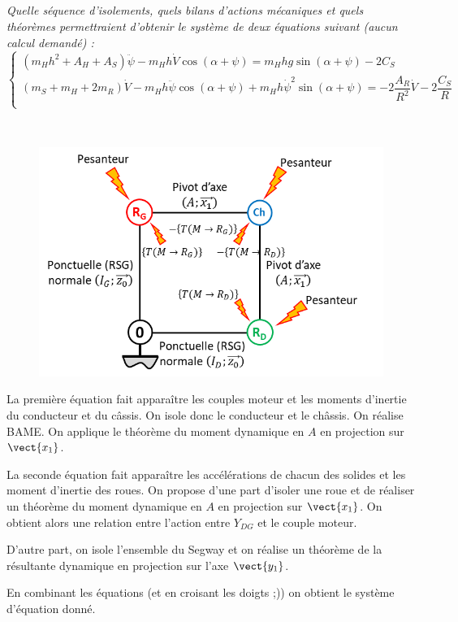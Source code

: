\documentclass[10pt,fleqn]{article} %
\begin{document}
\subparagraph{\label{q_19}}\textit{Quelle séquence d’isolements, quels bilans d'actions mécaniques et quels théorèmes permettraient d'obtenir le système de deux équations suivant (aucun calcul demandé) :}
$$
\left\{
\begin{array}{l}
\left( m_H h^2 +A_H + A_S\right)\ddot{\psi} - m_H h \dot{V} \cos\left(\alpha+\psi\right) = m_H hg \sin\left(\alpha + \psi\right) - 2C_S \\
\left( m_S +m_H + 2m_R\right)\dot{V} - m_H h \ddot{\psi} \cos\left(\alpha+\psi\right) 
+ m_H h \dot{\psi}^2 \sin\left(\alpha+\psi\right) =  - 2\dfrac{A_R}{R^2}\dot{V} - 2\dfrac{C_S}{R}  \\
\end{array}
\right.
$$
\ifprof
\begin{corrige} ~\\

\begin{figure}[H]
\centering
\includegraphics[width=0.5\linewidth]{cor_08}
\end{figure}

La première équation fait apparaître les couples moteur et les moments d'inertie du conducteur et du câssis. On isole donc le conducteur et le châssis. On réalise BAME.
On applique le théorème du moment dynamique en $A$ en projection sur $\vect{x_1}$.

La seconde équation fait apparaître les accélérations de chacun des solides et les moment d'inertie des roues. 
On propose d'une part d'isoler une  roue et de réaliser un théorème du moment dynamique en $A$ en projection sur $\vect{x_1}$. On obtient alors une relation entre l'action entre $Y_{DG}$ et le couple moteur.

D'autre part, on isole l'ensemble du Segway et on réalise un théorème de la résultante dynamique en projection sur l'axe  $\vect{y_1}$.

En combinant les équations (et en croisant les doigts ;)) on obtient le système d'équation donné. 

\end{corrige}
\else
\fi
\end{document}
